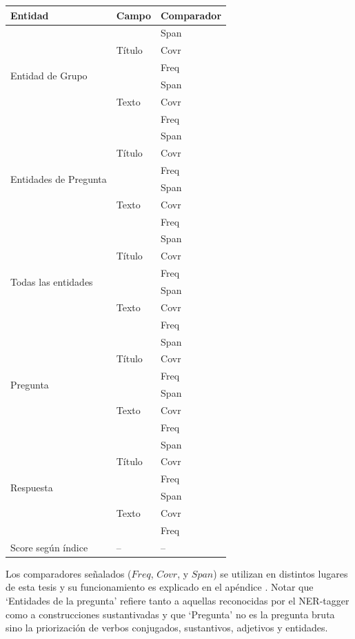 \begin{center}
\begin{tabular}{| l | l | l |}
\hline
Entidad & Campo & Comparador \\ \hline
\multirow{6}{*}{Entidad de Grupo} & \multirow{3}{*}{Título} & Span \\ 
& & Covr \\
& & Freq \\ \cline{2-3}
& \multirow{3}{*}{Texto} & Span \\ 
& & Covr \\
& & Freq \\ \hline
\multirow{6}{*}{Entidades de Pregunta} & \multirow{3}{*}{Título} & Span \\ 
& & Covr \\
& & Freq \\ \cline{2-3}
& \multirow{3}{*}{Texto} & Span \\ 
& & Covr \\
& & Freq \\ \hline
\multirow{6}{*}{Todas las entidades} & \multirow{3}{*}{Título} & Span \\ 
& & Covr \\
& & Freq \\ \cline{2-3}
& \multirow{3}{*}{Texto} & Span \\ 
& & Covr \\
& & Freq \\ \hline
\multirow{6}{*}{Pregunta} & \multirow{3}{*}{Título} & Span \\ 
& & Covr \\
& & Freq \\ \cline{2-3}
& \multirow{3}{*}{Texto} & Span \\ 
& & Covr \\
& & Freq \\ \hline
\multirow{6}{*}{Respuesta} & \multirow{3}{*}{Título} & Span \\ 
& & Covr \\
& & Freq \\ \cline{2-3}
& \multirow{3}{*}{Texto} & Span \\ 
& & Covr \\
& & Freq \\ \hline
Score según índice & -- & -- \\ \hline
\end{tabular}
\end{center}

Los comparadores señalados ($Freq$, $Covr$, y $Span$) se utilizan en distintos lugares de esta tesis y su funcionamiento es explicado en el apéndice . Notar que `Entidades de la pregunta' refiere tanto a aquellas reconocidas por el NER-tagger como a construcciones sustantivadas y que `Pregunta' no es la pregunta bruta sino la priorización de verbos conjugados, sustantivos, adjetivos y entidades. 

